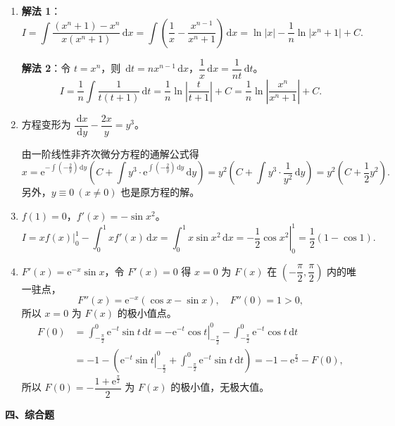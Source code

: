 \documentclass[a4paper,11pt]{ctexart}
\newcommand{\dd}{\,\mathrm{d}}
\newcommand{\e}{\mathrm{e}}
\begin{document}
\begin{enumerate}[label=\arabic*., start=11, leftmargin=2em, itemsep=0.9em, topsep=0.5em]
  \item \textbf{解法 1}：
  \[
    I=\int\frac{(x^n+1)-x^n}{x(x^n+1)}\dd x
    =\int\left(\frac{1}{x}-\frac{x^{n-1}}{x^n+1}\right)\dd x
    =\ln|x|-\frac{1}{n}\ln|x^n+1|+C.
  \]

  \textbf{解法 2}：令 $t=x^n$，则 $\dd t=nx^{n-1}\dd x$，$\dfrac{1}{x}\dd x=\dfrac{1}{nt}\dd t$。
  \[
    I=\frac{1}{n}\int\frac{1}{t(t+1)}\dd t
    =\frac{1}{n}\ln\left|\frac{t}{t+1}\right|+C
    =\frac{1}{n}\ln\left|\frac{x^n}{x^n+1}\right|+C.
  \]

  \item 方程变形为 $\dfrac{\dd x}{\dd y}-\dfrac{2x}{y}=y^3$。

  由一阶线性非齐次微分方程的通解公式得
  \[
    x=\e^{-\int\left(-\frac{2}{y}\right)\dd y}\left(C+\int y^3\cdot\e^{\int\left(-\frac{2}{y}\right)\dd y}\dd y\right)
    =y^2\left(C+\int y^3\cdot\frac{1}{y^2}\dd y\right)
    =y^2\left(C+\frac{1}{2}y^2\right).
  \]
  另外，$y\equiv 0\ (x\neq 0)$ 也是原方程的解。

  \item $f(1)=0$，$f'(x)=-\sin x^2$。
  \[
    I=\left.xf(x)\right|_0^1-\int_0^1 xf'(x)\dd x
    =\int_0^1 x\sin x^2\dd x
    =\left.-\frac{1}{2}\cos x^2\right|_0^1
    =\frac{1}{2}(1-\cos 1).
  \]

  \item $F'(x)=\e^{-x}\sin x$，令 $F'(x)=0$ 得 $x=0$ 为 $F(x)$ 在 $\left(-\dfrac{\pi}{2},\dfrac{\pi}{2}\right)$ 内的唯一驻点，
  \[
    F''(x)=\e^{-x}(\cos x-\sin x),\quad F''(0)=1>0,
  \]
  所以 $x=0$ 为 $F(x)$ 的极小值点。
  \begin{align*}
    F(0) &= \int_{-\frac{\pi}{2}}^0 \e^{-t}\sin t\dd t = \left.-\e^{-t}\cos t\right|_{-\frac{\pi}{2}}^0 - \int_{-\frac{\pi}{2}}^0 \e^{-t}\cos t\dd t \\
         &= -1 - \left(\left.\e^{-t}\sin t\right|_{-\frac{\pi}{2}}^0 + \int_{-\frac{\pi}{2}}^0 \e^{-t}\sin t\dd t\right) = -1 - \e^{\frac{\pi}{2}} - F(0),
  \end{align*}
  所以 $F(0)=-\dfrac{1+\e^{\frac{\pi}{2}}}{2}$ 为 $F(x)$ 的极小值，无极大值。
\end{enumerate}

\vspace{0.6em}

\textbf{四、综合题}
\end{document}
